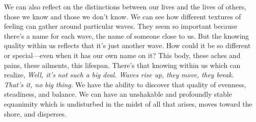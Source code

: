 We can also reflect on the distinctions between our lives and the lives 
of others, those we know and those we don't know. We can see how 
different textures of feeling can gather around particular waves. They 
seem so important because there's a name for each wave, the name of 
someone close to us. But the knowing quality within us reflects that 
it's just another wave. How could it be so different or special---even 
when it has our own name on it? This body, these aches and pains, these 
ailments, this lifespan. There's that knowing within us which can 
realize, \emph{Well, it's not such a big deal. Waves rise up, they 
move, they break. That's it, no big thing.} We have the ability to 
discover that quality of evenness, steadiness, and balance. We can have 
an unshakable and profoundly stable equanimity which is undisturbed in 
the midst of all that arises, moves toward the shore, and disperses.


